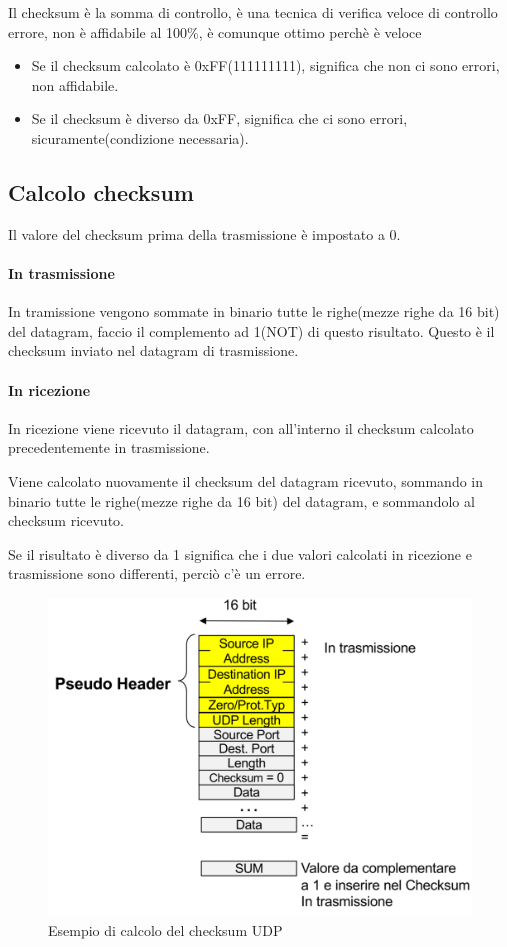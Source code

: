 Il checksum è la somma di controllo, è una tecnica di verifica veloce di controllo errore, non è affidabile al 100\%, è comunque ottimo perchè è veloce  
\begin{itemize}
    \item Se il checksum calcolato è 0xFF(111111111), significa che non ci sono errori, non affidabile.
    \item Se il checksum è diverso da 0xFF, significa che ci sono errori, sicuramente(condizione necessaria).
\end{itemize}
\subsection{Calcolo checksum}
Il valore del checksum prima della trasmissione è impostato a 0.
 \paragraph{In trasmissione}
In tramissione vengono sommate in binario tutte le righe(mezze righe da 16 bit) del datagram, faccio il complemento ad 1(NOT) di questo risultato. Questo è il checksum inviato nel datagram di trasmissione.
\paragraph{In ricezione}
In ricezione viene ricevuto il datagram, con all'interno il checksum calcolato precedentemente in trasmissione. 

Viene calcolato nuovamente il checksum del datagram ricevuto, sommando in binario tutte le righe(mezze righe da 16 bit) del datagram, e sommandolo al checksum ricevuto. 

Se il risultato è diverso da 1 significa che i due valori calcolati in ricezione e trasmissione sono differenti, perciò c'è un errore.


\begin{figure}[h!]
    \centering
    \includegraphics[width=1\textwidth]{images/checksum_udp.png}
    \caption{Esempio di calcolo del checksum UDP}
    \label{fig:checksumudp}
\end{figure}

